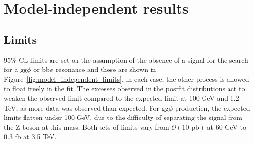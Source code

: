 \section{Model-independent results}

\subsection{Limits}

95\% \ac{CL} limits are set on the assumption of the absence of a signal for the search for a gg$\phi$ or bb$\phi$ resonance and these are shown in Figure~\ref{fig:model_independent_limits}.
In each case, the other process is allowed to float freely in the fit.
The excesses observed in the postfit distributions act to weaken the observed limit compared to the expected limit at 100 GeV and 1.2 TeV, as more data was observed than expected.
For gg$\phi$ production, the expected limits flatten under 100 GeV, due to the difficulty of separating the signal from the Z boson at this mass.
Both sets of limits vary from $\mathcal{O}(10\text{ pb})$ at 60 GeV to $0.3$ fb at 3.5 TeV. \\


